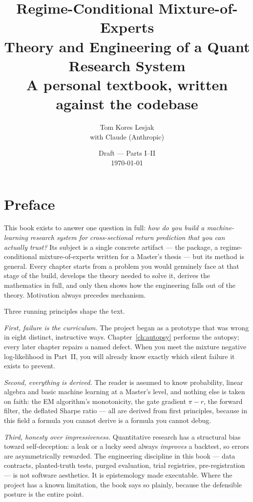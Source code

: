 \documentclass[11pt,openany]{book}
\title{\Huge Regime-Conditional Mixture-of-Experts\\[6pt]
       \Large Theory and Engineering of a Quant Research System\\[18pt]
       \normalsize A personal textbook, written against the \code{nec\_baseline} codebase}
\author{Tom Kores Lesjak\\ \small with Claude (Anthropic)}
\date{Draft --- Parts I--II \\ \today}
\begin{document}
\frontmatter
\maketitle

\chapter*{Preface}

This book exists to answer one question in full: \emph{how do you build a
machine-learning research system for cross-sectional return prediction that
you can actually trust?} Its subject is a single concrete artifact --- the
 package, a regime-conditional mixture-of-experts written
for a Master's thesis --- but its method is general. Every chapter starts from
a problem you would genuinely face at that stage of the build, develops the
theory needed to solve it, derives the mathematics in full, and only then
shows how the engineering falls out of the theory. Motivation always precedes
mechanism.

Three running principles shape the text.

\emph{First, failure is the curriculum.} The project began as a prototype
that was wrong in eight distinct, instructive ways. Chapter~\ref{ch:autopsy}
performs the autopsy; every later chapter repairs a named defect. When you
meet the mixture negative log-likelihood in Part~II, you will already know
exactly which silent failure it exists to prevent.

\emph{Second, everything is derived.} The reader is assumed to know
probability, linear algebra and basic machine learning at a Master's level,
and nothing else is taken on faith: the EM algorithm's monotonicity, the gate
gradient $\pi - r$, the forward filter, the deflated Sharpe ratio --- all are
derived from first principles, because in this field a formula you cannot
derive is a formula you cannot debug.

\emph{Third, honesty over impressiveness.} Quantitative research has a
structural bias toward self-deception: a leak or a lucky seed always
\emph{improves} a backtest, so errors are asymmetrically rewarded. The
engineering discipline in this book --- data contracts, planted-truth tests,
purged evaluation, trial registries, pre-registration --- is not software
aesthetics. It is epistemology made executable. Where the project has a known
limitation, the book says so plainly, because the defensible posture is the
entire point.
\end{document}
